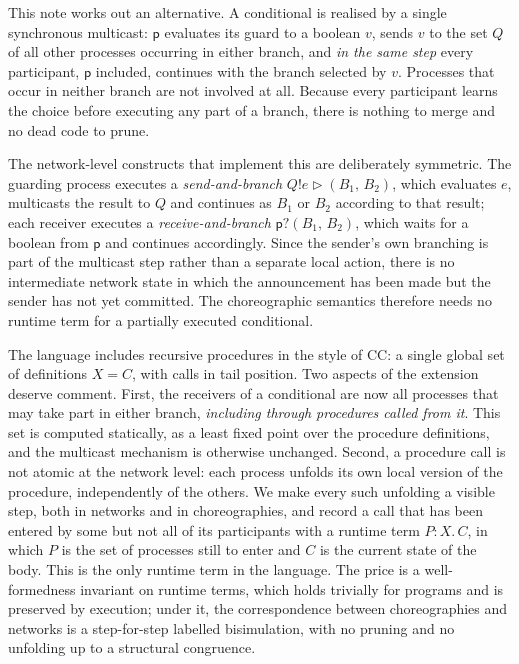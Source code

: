 \documentclass[11pt]{article}
\theoremstyle{plain}
\theoremstyle{definition}
\theoremstyle{remark}
\newcommand{\pp}{\mathsf{p}}
\newcommand{\sendbr}[4]{#1!#2 \mathbin{\triangleright} (#3,\, #4)}
\newcommand{\recvbr}[3]{#1?(#2,\, #3)}
\newcommand{\rt}[3]{#1\mathbin{:}#2.\,#3}
\begin{document}
This note works out an alternative.  A conditional is realised by a single
synchronous multicast: $\pp$ evaluates its guard to a boolean $v$, sends $v$
to the set $Q$ of all other processes occurring in either branch, and
\emph{in the same step} every participant, $\pp$ included, continues with the
branch selected by $v$.  Processes that occur in neither branch are not
involved at all.  Because every participant learns the choice before executing
any part of a branch, there is nothing to merge and no dead code to prune.

The network-level constructs that implement this are deliberately symmetric.
The guarding process executes a \emph{send-and-branch}
$\sendbr{Q}{e}{B_1}{B_2}$, which evaluates $e$, multicasts the result to $Q$
and continues as $B_1$ or $B_2$ according to that result; each receiver
executes a \emph{receive-and-branch} $\recvbr{\pp}{B_1}{B_2}$, which waits for
a boolean from $\pp$ and continues accordingly.  Since the sender's own
branching is part of the multicast step rather than a separate local action,
there is no intermediate network state in which the announcement has been
made but the sender has not yet committed.  The choreographic semantics
therefore needs no runtime term for a partially executed conditional.

The language includes recursive procedures in the style of CC: a single
global set of definitions $X = C$, with calls in tail position.  Two
aspects of the extension deserve comment.  First, the receivers of a
conditional are now all processes that may take part in either branch,
\emph{including through procedures called from it}.  This set is computed
statically, as a least fixed point over the procedure definitions, and the
multicast mechanism is otherwise unchanged.  Second, a procedure call is not
atomic at the network level: each process unfolds its own local version of
the procedure, independently of the others.  We make every such unfolding a
visible step, both in networks and in choreographies, and record a call that
has been entered by some but not all of its participants with a runtime term
$\rt{P}{X}{C}$, in which $P$ is the set of processes still to enter and $C$
is the current state of the body.  This is the only runtime term in the
language.  The price is a well-formedness invariant on runtime terms, which
holds trivially for programs and is preserved by execution; under it, the
correspondence between choreographies and networks is a step-for-step
labelled bisimulation, with no pruning and no unfolding up to a structural
congruence.
\end{document}
